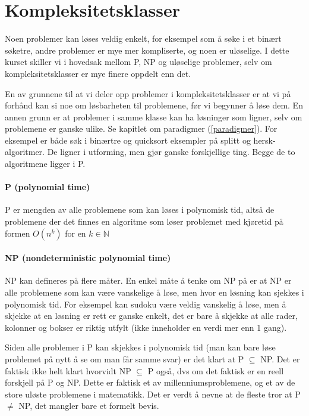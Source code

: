 \section{Kompleksitetsklasser}

Noen problemer kan løses veldig enkelt, for eksempel som å søke i et binært søketre, andre problemer er mye mer kompliserte, og noen er uløselige. I dette kurset skiller vi i hovedsak mellom P, NP og uløselige problemer, selv om kompleksitetsklasser er mye finere oppdelt enn det. 

En av grunnene til at vi deler opp problemer i kompleksitetsklasser er at vi på forhånd kan si noe om løsbarheten til problemene, før vi begynner å løse dem. En annen grunn er at problemer i samme klasse kan ha løsninger som ligner, selv om problemene er ganske ulike. Se kapitlet om paradigmer (\ref{paradigmer}). For eksempel er både søk i binærtre og quicksort eksempler på splitt og hersk-algoritmer. De ligner i utforming, men gjør ganske forskjellige ting. Begge de to algoritmene ligger i P. 



\paragraph{P (polynomial time)}
P er mengden av alle problemene som kan løses i polynomisk tid, altså de problemene der det finnes en algoritme som løser problemet med kjøretid på formen $ O(n^k) $ for en $ k \in \mathbb{N} $

\paragraph{NP (nondeterministic polynomial time)}
NP kan defineres på flere måter. En enkel måte å tenke om NP på er at NP er alle problemene som kan være vanskelige å løse, men hvor en løsning kan sjekkes i polynomisk tid. For eksempel kan sudoku være veldig vanskelig å løse, men å skjekke at en løsning er rett er ganske enkelt, det er bare å skjekke at alle rader, kolonner og bokser er riktig utfylt (ikke inneholder en verdi mer enn 1 gang). 

Siden alle problemer i P kan skjekkes i polynomisk tid (man kan bare løse problemet på nytt å se om man får samme svar) er det klart at P $ \subseteq $ NP. Det er faktisk ikke helt klart hvorvidt NP $ \subseteq $ P også, dvs om det faktisk er en reell forskjell på P og NP. Dette er faktisk et av millenniumsproblemene, og et av de store uløste problemene i matematikk. Det er verdt å nevne at de fleste tror at P $ \neq $ NP, det mangler bare et formelt bevis.

